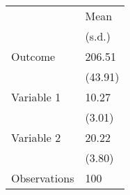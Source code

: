 \begin{tabular}{ll}
\toprule
 & Mean \\
 & (s.d.) \\
\midrule
Outcome & 206.51 \\
  & (43.91) \\
Variable 1 & 10.27 \\
  & (3.01) \\
Variable 2 & 20.22 \\
  & (3.80) \\
Observations & 100 \\
\bottomrule
\end{tabular}
